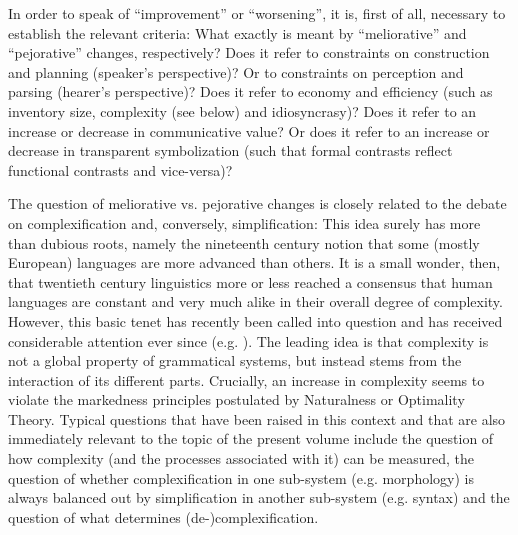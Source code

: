 \documentclass[output=paper,colorlinks,citecolor=brown]{langscibook}
\begin{document}
In order to speak of ``improvement'' or ``worsening'', it is, first of all, necessary to establish the relevant criteria: What exactly is meant by ``meliorative'' and ``pejorative'' changes, respectively? Does it refer to constraints on construction and planning (speaker's perspective)? Or to constraints on perception and parsing (hearer's perspective)? Does it refer to economy and efficiency (such as inventory size, complexity (see below) and idiosyncrasy)? Does it refer to an increase or decrease in communicative value? Or does it refer to an increase or decrease in transparent symbolization (such that formal contrasts reflect functional contrasts and vice-versa)?

The question of meliorative vs. pejorative changes is closely related to the debate on complexification and, conversely, simplification: This idea surely has more than dubious roots, namely the nineteenth century notion that some (mostly European) languages are more advanced than others. It is a small wonder, then, that twentieth century linguistics more or less reached a consensus that human languages are constant and very much alike in their overall degree of complexity. However, this basic tenet has recently been called into question and has received considerable attention ever since (e.g. \citealt{Dahl_2004, Miestamo_2008, Garrett_2008, Albright_2008, Sampson_2009, Trudgill_2011, Newmeyer_2014, SeilerBaechler_2016}). The leading idea is that complexity is not a global property of grammatical systems, but instead stems from the interaction of its different parts. Crucially, an increase in complexity seems to violate the markedness principles postulated by Naturalness or Optimality Theory. Typical questions that have been raised in this context and that are also immediately relevant to the topic of the present volume include the question of how complexity (and the processes associated with it) can be measured, the question of whether complexification in one sub-system (e.g. morphology) is always balanced out by simplification in another sub-system (e.g. syntax) and the question of what determines (de-)complexification.
    
\end{document}

